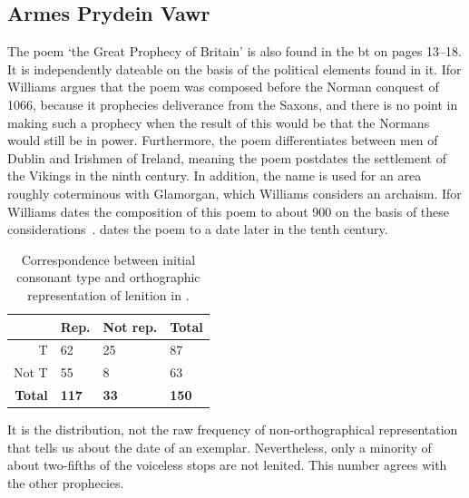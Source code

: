 \subsection{Armes Prydein Vawr}
The poem  `the Great Prophecy of Britain' is also found in the \gls{bt} on pages 13--18. It is independently dateable on the basis of the political elements found in it. Ifor Williams argues that the poem was composed before the Norman conquest of 1066, because it prophecies deliverance from the Saxons, and there is no point in making such a prophecy when the result of this would be that the Normans would still be in power. Furthermore, the poem differentiates between men of Dublin and Irishmen of Ireland, meaning the poem postdates the settlement of the Vikings in the ninth century. In addition, the name  is used for an area roughly coterminous with Glamorgan, which Williams considers an archaism. Ifor Williams dates the composition of this poem to about 900 on the basis of these considerations~\autocite[x--xii]{williams_armes_1955}. \Textcite{dumville_brittany_1983} dates the poem to a date later in the tenth century. 


\begin{table}[h]
\centering
\begin{tabular}{@{}rlll@{}}
\toprule
 & \textbf{Rep.} & \textbf{Not rep.} & \textbf{Total} \\ \midrule
T & 62 & 25 & 87 \\
Not T & 55 & 8 & 63 \\
\textbf{Total} & \textbf{117} & \textbf{33} & \textbf{150} \\ \bottomrule
\end{tabular}
\caption{Correspondence between initial consonant type and orthographic representation of lenition in .}
\label{armesprydeinnumbers}
\end{table}


It is the distribution, not the raw frequency of non-orthographical representation that tells us about the date of an exemplar. Nevertheless, only a minority of about two-fifths of the voiceless stops are not lenited. This number agrees with the other prophecies.

